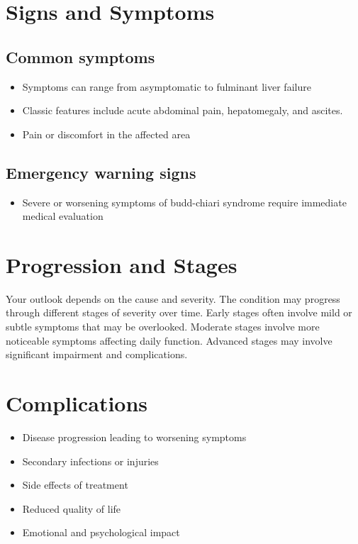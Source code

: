 \section{Signs and Symptoms}

\subsection{Common symptoms}
\begin{itemize}[noitemsep]
  \item Symptoms can range from asymptomatic to fulminant liver failure
  \item Classic features include acute abdominal pain, hepatomegaly, and ascites.
  \item Pain or discomfort in the affected area
  \end{itemize}

\subsection{Emergency warning signs}
\begin{itemize}[noitemsep]
  \item Severe or worsening symptoms of budd-chiari syndrome require immediate medical evaluation
\end{itemize}
\section{Progression and Stages}
Your outlook depends on the cause and severity. The condition may progress through different stages of severity over time. Early stages often involve mild or subtle symptoms that may be overlooked. Moderate stages involve more noticeable symptoms affecting daily function. Advanced stages may involve significant impairment and complications.
\section{Complications}
\begin{itemize}[noitemsep]
  \item Disease progression leading to worsening symptoms
  \item Secondary infections or injuries
  \item Side effects of treatment
  \item Reduced quality of life
  \item Emotional and psychological impact
\end{itemize}
